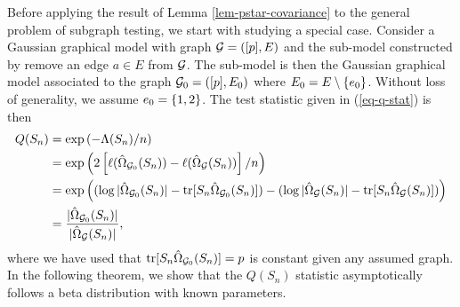 Before applying the result of Lemma \ref{lem-pstar-covariance} to the general problem of subgraph testing, we start with studying a special case. Consider a Gaussian graphical model with graph ${\mathcal{G}} = ([p], E)$ and the sub-model constructed by remove an edge $a \in E$ from ${\mathcal{G}}$. The sub-model is then the Gaussian graphical model associated to the graph ${\mathcal{G}}_0 = ([p], E_0)$ where $E_0 = E \setminus {\left\{e_0\right\}}$. Without loss of generality, we assume $e_0 = {\left\{1,2\right\}}$. The test statistic given in (\ref{eq-q-stat}) is then
\begin{align*}
    Q(S_n) 
    &= \exp\left(-\Lambda(S_n) / n\right)  \\
    &= \exp\left(2 \left[\ell(\hat\Omega_{{\mathcal{G}}_0}(S_n)) - \ell(\hat\Omega_{\mathcal{G}}(S_n))\right] / n\right) \\
    &= \exp\left(
        (\log |\hat\Omega_{{\mathcal{G}}_0}(S_n)| - {\textrm{tr}}[S_n\hat\Omega_{{\mathcal{G}}_0}(S_n)])
        -    
        (\log |\hat\Omega_{\mathcal{G}}(S_n)| - {\textrm{tr}}[S_n\hat\Omega_{\mathcal{G}}(S_n)])\right) \\
    &= \frac{|\hat\Omega_{{\mathcal{G}}_0}(S_n)|}{|\hat\Omega_{{\mathcal{G}}}(S_n)|},
\end{align*}
where we have used that ${\textrm{tr}}[S_n\hat\Omega_{{\mathcal{G}}_0}(S_n)] = p$ is constant given any assumed graph. In the following theorem, we show that the $Q(S_n)$ statistic asymptotically follows a beta distribution with known parameters.

